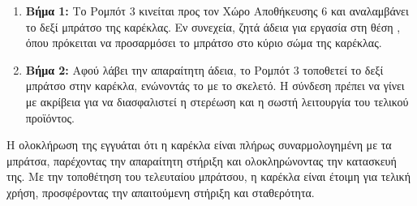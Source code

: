 \begin{enumerate}
  \item \textbf{Βήμα 1:} Το Ρομπότ 3 κινείται προς τον Χώρο Αποθήκευσης 6 και αναλαμβάνει το δεξί μπράτσο της καρέκλας. Εν συνεχεία, ζητά άδεια για εργασία στη θέση , όπου πρόκειται να προσαρμόσει το μπράτσο στο κύριο σώμα της καρέκλας.
  \item \textbf{Βήμα 2:} Αφού λάβει την απαραίτητη άδεια, το Ρομπότ 3 τοποθετεί το δεξί μπράτσο στην καρέκλα, ενώνοντάς το με το σκελετό. Η σύνδεση πρέπει να γίνει με ακρίβεια για να διασφαλιστεί η στερέωση και η σωστή λειτουργία του τελικού προϊόντος.
\end{enumerate}

Η ολοκλήρωση της  εγγυάται ότι η καρέκλα είναι πλήρως συναρμολογημένη με τα μπράτσα, παρέχοντας την απαραίτητη στήριξη και ολοκληρώνοντας την κατασκευή της. Με την τοποθέτηση του τελευταίου μπράτσου, η καρέκλα είναι έτοιμη για τελική χρήση, προσφέροντας την απαιτούμενη στήριξη και σταθερότητα.